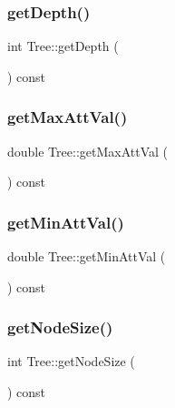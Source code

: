 \mbox{\label{classTree_ad9759be8d8887d04a29ebae7240ced85}} 
\subsubsection{\texorpdfstring{get\+Depth()}{getDepth()}}
{\footnotesize\ttfamily int Tree\+::get\+Depth (\begin{DoxyParamCaption}{ }\end{DoxyParamCaption}) const}

\mbox{\label{classTree_a70c0b9e6a3a982f6d7c0d38f81019bcf}} 
\subsubsection{\texorpdfstring{get\+Max\+Att\+Val()}{getMaxAttVal()}}
{\footnotesize\ttfamily double Tree\+::get\+Max\+Att\+Val (\begin{DoxyParamCaption}{ }\end{DoxyParamCaption}) const}

\mbox{\label{classTree_a3342558dd44c84ad29c19422f5af4e72}} 
\subsubsection{\texorpdfstring{get\+Min\+Att\+Val()}{getMinAttVal()}}
{\footnotesize\ttfamily double Tree\+::get\+Min\+Att\+Val (\begin{DoxyParamCaption}{ }\end{DoxyParamCaption}) const}

\mbox{\label{classTree_a0ab54e1652274e304c25473759dcd0da}} 
\subsubsection{\texorpdfstring{get\+Node\+Size()}{getNodeSize()}}
{\footnotesize\ttfamily int Tree\+::get\+Node\+Size (\begin{DoxyParamCaption}{ }\end{DoxyParamCaption}) const}

